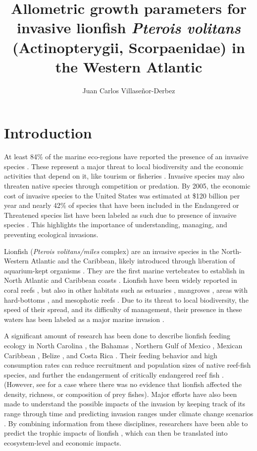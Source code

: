 \documentclass[fleqn,10pt,lineno]{wlpeerj} %
\title{Allometric growth parameters for invasive lionfish \emph{Pterois
volitans} (Actinopterygii, Scorpaenidae) in the Western Atlantic}
\author[1]{Juan Carlos Villaseñor-Derbez}
\affil[1]{Bren School of Environmental Sciences and Management, University of
California Santa Barbara, Santa Barbara, California, U.S.}
\theoremstyle{definition}
\theoremstyle{definition}
\theoremstyle{definition}
\theoremstyle{remark}
\begin{document}
\flushbottom
\maketitle
\thispagestyle{empty}

\section{Introduction}\label{introduction}

At least 84\% of the marine eco-regions have reported the presence of an
invasive species \citep{molnar_2008}. These represent a major threat to
local biodiversity and the economic activities that depend on it, like
tourism or fisheries \citep{bax_2003}. Invasive species may also
threaten native species through competition \citep{davis_2003} or
predation. By 2005, the economic cost of invasive species to the United
States was estimated at \$120 billion per year and nearly 42\% of
species that have been included in the Endangered or Threatened species
list have been labeled as such due to presence of invasive species
\citep{pimentel_2005}. This highlights the importance of understanding,
managing, and preventing ecological invasions.

Lionfish (\emph{Pterois volitans/miles} complex) are an invasive species
in the North-Western Atlantic and the Caribbean, likely introduced
through liberation of aquarium-kept organisms \citep{betancurr_2011}.
They are the first marine vertebrates to establish in North Atlantic
\citep{schofield_2009,schofield_2010} and Caribbean coasts
\citep{sabidoitza_2016}. Lionfish have been widely reported in coral
reefs \citep{aguilarperera_2010}, but also in other habitats such as
estuaries \citep{jud_2011}, mangroves \citep{barbour_2010}, areas with
hard-bottoms \citep{muoz_2011}, and mesophotic reefs
\citep{andradibrown_2017}. Due to its threat to local biodiversity, the
speed of their spread, and its difficulty of management, their presence
in these waters has been labeled as a major marine invasion
\citep{hixon_2016}.

A significant amount of research has been done to describe lionfish
feeding ecology in North Carolina \citep{muoz_2011}, the Bahamas
\citep{morris_2009,cote_2013}, Northern Gulf of Mexico
\citep{dahl_2014}, Mexican Caribbean
\citep{valdezmoreno_2012,villaseorderbez_2014}, Belize
\citep{hackerott_2017}, and Costa Rica \citep{sandel_2015}. Their
feeding behavior and high consumption rates can reduce recruitment
\citep{albins_2008} and population sizes \citep{green_2012} of native
reef-fish species, and further the endangerment of critically endangered
reef fish \citep{rocha_2015}. (However, see \citet{hackerott_2017} for a
case where there was no evidence that lionfish affected the density,
richness, or composition of prey fishes). Major efforts have also been
made to understand the possible impacts of the invasion by keeping track
of its range through time \citep{schofield_2009,schofield_2010} and
predicting invasion ranges under climate change scenarios
\citep{grieve_2016}. By combining information from these disciplines,
researchers have been able to predict the trophic impacts of lionfish
\citep{ariasgonzalez_2011}, which can then be translated into
ecosystem-level and economic impacts.
\end{document}
